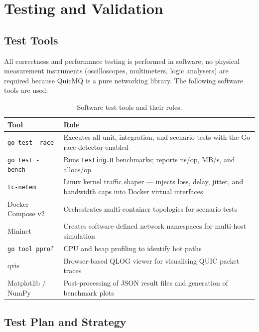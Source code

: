 \documentclass[12pt, a4paper, oneside]{report}
\begin{document}
\chapter{Testing and Validation}
\label{ch:testing}

\section{Test Tools}
\label{sec:test-tools}

All correctness and performance testing is performed in software; no physical measurement instruments (oscilloscopes, multimeters, logic analysers) are required because QuicMQ is a pure networking library. The following software tools are used:

\begin{table}[H]
  \centering
  \caption{Software test tools and their roles.}
  \label{tab:test-tools}
  \begin{tabularx}{\textwidth}{lX}
    \toprule
    \textbf{Tool} & \textbf{Role} \\
    \midrule
    \texttt{go test -race}      & Executes all unit, integration, and scenario tests with the Go race detector enabled \\
    \texttt{go test -bench}     & Runs \texttt{testing.B} benchmarks; reports ns/op, MB/s, and allocs/op \\
    \texttt{tc-netem}           & Linux kernel traffic shaper — injects loss, delay, jitter, and bandwidth caps into Docker virtual interfaces \\
    Docker Compose v2           & Orchestrates multi-container topologies for scenario tests \\
    Mininet                     & Creates software-defined network namespaces for multi-host simulation \\
    \texttt{go tool pprof}      & CPU and heap profiling to identify hot paths \\
    qvis                        & Browser-based QLOG viewer for visualising QUIC packet traces \\
    Matplotlib / NumPy          & Post-processing of JSON result files and generation of benchmark plots \\
    \bottomrule
  \end{tabularx}
\end{table}

\section{Test Plan and Strategy}
\label{sec:test-plan}
\end{document}

